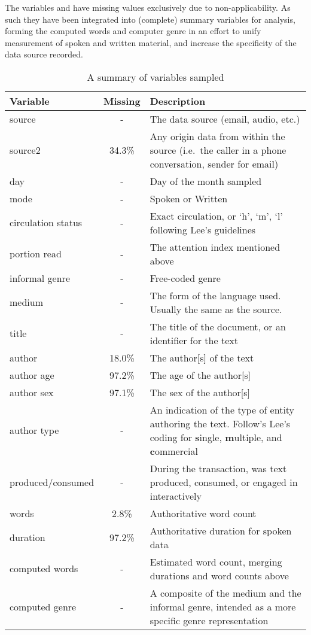 The variables  and  have missing values exclusively due to non-applicability.  As such they have been integrated into (complete) summary variables for analysis, forming the computed words and computer genre in an effort to unify measurement of spoken and written material, and increase the specificity of the data source recorded.


\begin{table}[htb]
\centering
    \begin{tabular}{|l|c|p{7cm}|}
    \hline
    \textbf{Variable} & \textbf{Missing} & \textbf{Description} \\ \hline
   
    source              & - & The data source (email, audio, etc.) \\ \hline
    source2             & 34.3\% & Any origin data from within the source (i.e.\ the caller in a phone conversation, sender for email) \\ \hline
    day                 & - & Day of the month sampled \\ \hline
    mode                & - & Spoken or Written \\ \hline
    circulation status  & - & Exact circulation, or `h', `m', `l' following Lee's guidelines\\ \hline
    portion read        & - & The attention index mentioned above \\ \hline
    informal genre      & - & Free-coded genre \\ \hline
    medium              & - & The form of the language used.  Usually the same as the source. \\ \hline
    title               & - & The title of the document, or an identifier for the text \\ \hline
    author              & 18.0\% & The author[s] of the text\\ \hline
    author age          & 97.2\% & The age of the author[s] \\ \hline
    author sex          & 97.1\% & The sex of the author[s] \\ \hline
    author type         & - & An indication of the type of entity authoring the text.  Follow's Lee's coding for \textbf{s}ingle, \textbf{m}ultiple, and \textbf{c}ommercial\\ \hline
    produced/consumed   & - & During the transaction, was text produced, consumed, or engaged in interactively \\ \hline 
    words               & 2.8\% & Authoritative word count\\ \hline
    duration            & 97.2\% & Authoritative duration for spoken data\\ \hline
    computed words      & - & Estimated word count, merging durations and word counts above\\ \hline
    computed genre      & - & A composite of the medium and the informal genre, intended as a more specific genre representation \\
    \hline
    \end{tabular}
\caption{A summary of variables sampled}
\label{table:personal:variables}
\end{table}
